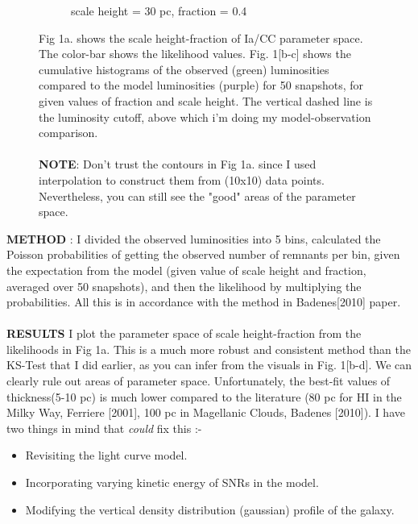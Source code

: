 \documentclass[10pt,a4paper]{article}
\begin{document}
\begin{figure}[h!]
\begin{subfigure}[b]{0.5\textwidth}
		\caption{scale height = 30 pc, fraction = 0.4}
	\end{subfigure}
	\caption{Fig 1a. shows the scale height-fraction of Ia/CC parameter space. The color-bar shows the likelihood values. Fig. 1[b-c] shows the cumulative histograms of the observed (green) luminosities compared to the model luminosities (purple) for 50 snapshots, for given values of fraction and scale height. The vertical dashed line is the luminosity cutoff, above which i'm doing my model-observation comparison.\\\\ \textbf{NOTE}: Don't trust the contours in Fig 1a. since I used interpolation to construct them from (10x10) data points. Nevertheless, you can still see the "good" areas of the parameter space.}
\end{figure}
\noindent\makebox[\linewidth]{\rule{\paperwidth}{0.4pt}}
\textbf{METHOD} : I divided the observed luminosities into 5 bins, calculated the Poisson probabilities of getting the observed number of remnants per bin, given the expectation from the model (given value of scale height and fraction, averaged over 50 snapshots), and then the likelihood by multiplying the probabilities. All this is in accordance with the method in Badenes[2010] paper.\\\\
\textbf{RESULTS}
I plot the parameter space of scale height-fraction from the likelihoods in Fig 1a. This is a much more robust and consistent method than the KS-Test that I did earlier, as you can infer from the visuals in Fig. 1[b-d]. We can clearly rule out areas of parameter space. Unfortunately, the best-fit values of thickness(5-10 pc) is much lower compared to the literature (80 pc for HI in the Milky Way, Ferriere [2001], 100 pc in Magellanic Clouds, Badenes [2010]). I have two things in mind that \emph{could} fix this :-
\begin{itemize}
	\item Revisiting the light curve model. 
	\item Incorporating varying kinetic energy of SNRs in the model.
	\item Modifying the vertical density distribution (gaussian) profile of the galaxy.
\end{itemize}

 
\end{document}
